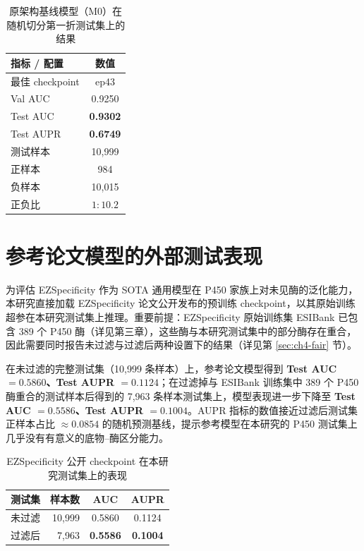 \begin{table}[htbp]
  \centering
  \caption{原架构基线模型（M0）在随机切分第一折测试集上的结果}
  \label{tab:ch4-baseline}
  \begin{tabular}{lc}
    \toprule
    指标 / 配置 & 数值 \\
    \midrule
    最佳 checkpoint   & ep43 \\
    Val AUC           & 0.9250 \\
    Test AUC          & \textbf{0.9302} \\
    Test AUPR         & \textbf{0.6749} \\
    测试样本          & 10{,}999 \\
    正样本            & 984 \\
    负样本            & 10{,}015 \\
    正负比            & $1:10.2$ \\
    \bottomrule
  \end{tabular}
\end{table}

\section{参考论文模型的外部测试表现}
\label{sec:ch4-external}

为评估 EZSpecificity 作为 SOTA 通用模型在 P450 家族上对未见酶的泛化能力，本研究直接加载 EZSpecificity 论文公开发布的预训练 checkpoint\cite{EZSpec2025}，以其原始训练超参在本研究测试集上推理。重要前提：EZSpecificity 原始训练集 ESIBank 已包含 389 个 P450 酶（详见第三章），这些酶与本研究测试集中的部分酶存在重合，因此需要同时报告未过滤与过滤后两种设置下的结果（详见第 \ref{sec:ch4-fair} 节）。

在未过滤的完整测试集（10{,}999 条样本）上，参考论文模型得到 \textbf{Test AUC $= 0.5860$、Test AUPR $= 0.1124$}；在过滤掉与 ESIBank 训练集中 389 个 P450 酶重合的测试样本后得到的 7{,}963 条样本测试集上，模型表现进一步下降至 \textbf{Test AUC $= 0.5586$、Test AUPR $= 0.1004$}。AUPR 指标的数值接近过滤后测试集正样本占比 $\approx 0.0854$ 的随机预测基线，提示参考模型在本研究的 P450 测试集上几乎没有有意义的底物--酶区分能力。

\begin{table}[htbp]
  \centering
  \caption{EZSpecificity 公开 checkpoint 在本研究测试集上的表现}
  \label{tab:ch4-paper}
  \begin{tabular}{lrcc}
    \toprule
    测试集 & 样本数 & AUC & AUPR \\
    \midrule
    未过滤     & 10{,}999 & 0.5860 & 0.1124 \\
    过滤后     & 7{,}963  & \textbf{0.5586} & \textbf{0.1004} \\
    \bottomrule
  \end{tabular}
\end{table}

